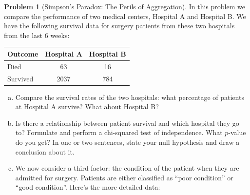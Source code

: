 \documentclass[10pt]{amsart}
\theoremstyle{definition}
\newtheorem{problem}[theorem]{Problem}
\newcommand{\1}[1]{\textbf{1}_{\left[#1\right]}} %
\begin{document}
\newpage
\begin{problem}[Simpson's Paradox: The Perils of Aggregation]

  In this problem we compare the performance of two medical centers, Hospital
  A and Hospital B. We have the following survival data for surgery patients from
  these two hospitals from the last 6 weeks:
  \begin{center}
    {\footnotesize\begin{tabular}{lcc}
      \hline
      \textbf{Outcome} & \textbf{Hospital A} & \textbf{Hospital B} \\
      \hline
      Died     &   63     & 16       \\
      Survived & 2037       & 784       \\
      \hline
    \end{tabular}}
  \end{center}
  \begin{enumerate}[(a)]
    \setlength{\itemsep}{1em}
    \item \label{item:1} Compare the survival rates of the two hospitals: what percentage of
    patients at Hospital A survive? What about Hospital B?
    \vspace{3cm}
    \item Is there a relationship between patient survival and which hospital
    they go to? Formulate and perform a chi-squared test of independence. What
    $p$-value do you get? In one or two sentences, state your null hypothesis
    and draw a conclusion about it.
    \vspace{3cm}
    \item We now consider a third factor: the condition of the patient when
    they are admitted for surgery. Patients are either classified as ``poor
    condition'' or ``good condition''. Here's the more detailed data:


\end{enumerate}
\end{problem}
\end{document}
